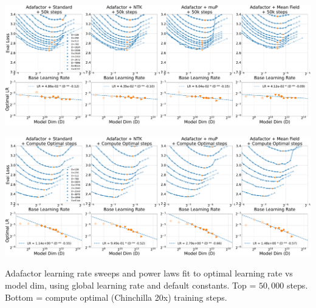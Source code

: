 \thispagestyle{plain}
\begin{SidewaysFigure}
\\
\includegraphics[width=0.98\linewidth]{icml2024/figures/lr_sweeps/compute_opt_appendix/adafactor+50k_steps.pdf}

\figvspace

\includegraphics[width=0.98\linewidth]{icml2024/figures/lr_sweeps/compute_opt_appendix/adafactor+compute_opt.pdf}
\caption{Adafactor learning rate sweeps and power laws fit to optimal learning rate vs model dim, using global learning rate and default constants. Top = $50{,}000$ steps. Bottom = compute optimal (Chinchilla 20x) training steps.}
\label{fig:app_compute_opt_adafactor}
\end{SidewaysFigure}
\clearpage




